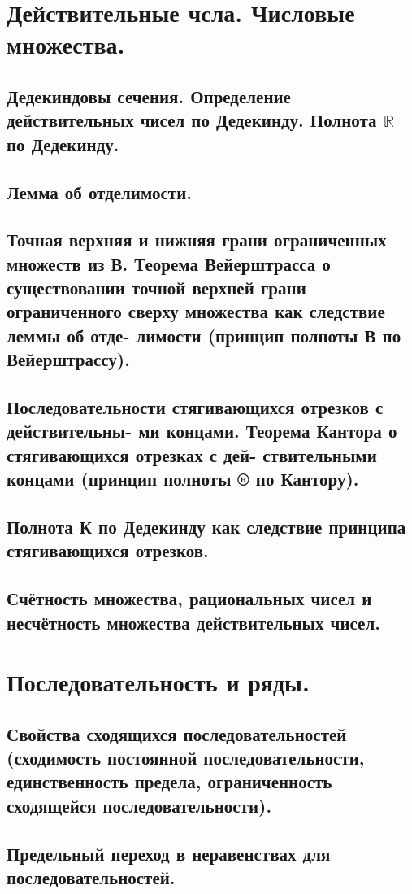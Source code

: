 \documentclass[12pt, a4paper]{article}
\newcommand{\R}{\mathbb{R}}
\begin{document}
\begin{centering}
\section{Действительные чсла. Числовые множества.}
\subsection{Дедекиндовы сечения. Определение действительных чисел по Дедекинду. Полнота $\R$ по Дедекинду.}
\subsection{Лемма об отделимости.}
\subsection{Точная верхняя и нижняя грани ограниченных множеств из В.
Теорема Вейерштрасса о существовании точной верхней грани
ограниченного сверху множества как следствие леммы об отде-
лимости (принцип полноты В по Вейерштрассу).}
\subsection{Последовательности стягивающихся отрезков с действительны-
ми концами. Теорема Кантора о стягивающихся отрезках с дей-
ствительными концами (принцип полноты ® по Кантору).}
\subsection{Полнота К по Дедекинду как следствие принципа стягивающихся
отрезков.}
\subsection{Счётность множества, рациональных чисел и несчётность множества действительных чисел.}
\section{Последовательность и ряды.}

\subsection{Свойства сходящихся последовательностей (сходимость постоянной последовательности, единственность предела, ограниченность сходящейся последовательности).}
\subsection{Предельный переход в неравенствах для последовательностей.}

\end{centering}
\end{document}
